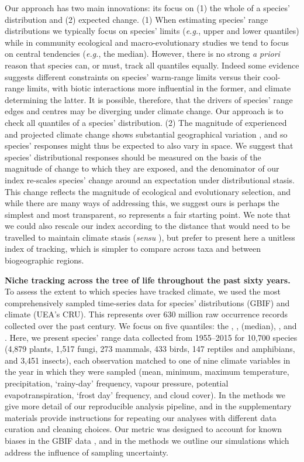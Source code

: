 \documentclass[12pt]{report}
\begin{document}
Our approach has two main innovations: its focus on (1) the whole of a
species' distribution and (2) expected change. (1) When estimating
species' range distributions we typically focus on species'
limits\supercite{Sexton2009} (\emph{e.g.}, upper and lower quantiles)
while in community ecological \supercite{Tilman2004} and
macro-evolutionary \supercite{Zanne2018} studies we tend to focus on
central tendencies (\emph{e.g.}, the median). However, there is no
strong \emph{a priori} reason that species can, or must, track all
quantiles equally. Indeed some evidence suggests different constraints
on species' warm-range limits versus their cool-range limits, with
biotic interactions more influential in the former, and climate
determining the latter\supercite{Freeman2018}.  It is possible,
therefore, that the drivers of species' range edges and centres may be
diverging under climate change. Our approach is to check all quantiles
of a species' distribution. (2) The magnitude of experienced and
projected climate change shows substantial geographical variation
\supercite{Loarie2009}, and so species' responses might thus be
expected to also vary in space. We suggest that species'
distributional responses should be measured on the basis of the
magnitude of change to which they are exposed, and the denominator of
our index re-scales species' change around an expectation under
distributional stasis.  This change reflects the magnitude of
ecological and evolutionary selection, and while there are many ways
of addressing this, we suggest ours is perhaps the simplest and most
transparent, so represents a fair starting point. We note that we
could also rescale our index according to the distance that would need
to be travelled to maintain climate stasis (\emph{sensu}
\citeauthor{Loarie2009}\supercite{Loarie2009}), but prefer to present
here a unitless index of tracking, which is simpler to compare across
taxa and between biogeographic regions.

\textbf{Niche tracking across the tree of life throughout the past
  sixty years.} To assess the extent to which species have tracked
climate, we used the most comprehensively sampled time-series data for
species' distributions (GBIF\supercite{url_gbif}) and climate (UEA's
CRU\supercite{Harris2014}). This represents over 630 million raw
occurrence records collected over the past century. We focus on five
quantiles: the , ,  (median), , and
. Here, we present species' range data collected from
1955--2015 for 10,700 species (4,879 plants, 1,517 fungi, 273 mammals,
433 birds, 147 reptiles and amphibians, and 3,451 insects), each
observation matched to one of nine climate variables in the year in
which they were sampled (mean, minimum, maximum temperature,
precipitation, `rainy-day' frequency, vapour pressure, potential
evapotranspiration, `frost day' frequency, and cloud cover). In the
methods we give more detail of our reproducible analysis pipeline, and
in the supplementary materials provide instructions for repeating our
analyses with different data curation and cleaning choices. Our metric
was designed to account for known biases in the GBIF data
\supercite{Beck2014}, and in the methods we outline our simulations
which address the influence of sampling uncertainty.
\end{document}
